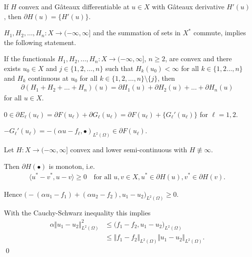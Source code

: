 \begin{frame}
  \begin{block}{}
    If $H$ convex and G\^{a}teaux differentiable
    at $u\in X$ with G\^{a}teaux derivative $H'(u)$, then
    $\partial H(u)=\{H'(u)\}$.
  \end{block}

  \pause

  $H_1,H_2,\ldots,H_n:X\to (-\infty,\infty]$ and the summation of sets in
  $X^\ast$ commute,
  \cite[S. 389, Theorem 47.B]{Zei85} implies the following statement.
  \begin{block}{}
    If the functionals $H_1,H_2,\ldots,H_n: X\to
    (-\infty,\infty]$, $n\geq 2$, are convex and there exists 
    $u_0\in X$ and $j\in\{1,2,\ldots,n\}$ such that $H_k(u_0)<\infty$
    for all $k\in\{1,2\ldots,n\}$
    and $H_k$ continuous at $u_0$ for all $k\in\{1,2,\ldots,n\}\setminus\{j\}$,
    then
    \begin{align*}
      \partial (H_1+H_2+\ldots+ H_n)(u) 
      = \partial H_1(u)+\partial H_2(u)+ \ldots + \partial H_n(u)
    \end{align*}
    for all $u\in X$.
  \end{block}
  \pause
  \medskip
  $0\in\partial E_\ell(u_\ell)
  = \partial F(u_\ell)+\partial G_\ell(u_\ell)=\partial F(u_\ell)+
  \{G_\ell'(u_\ell)\}$ for $\ell=1,2$.
\end{frame}

\begin{frame}
  $-G_\ell'(u_\ell)=-(\alpha u-f_\ell ,\bullet)_{L^2(\Omega)}\in\partial
  F(u_\ell)$.
  
  \pause
  \begin{block}{}
    Let $H:X\to (-\infty,\infty]$ convex and lower semi-continuous with
    $H\nequiv\infty$.
    
    Then $\partial H(\bullet)$ is monoton, i.e.
  \begin{align*}
    \langle u^\ast-v^\ast,u-v\rangle\geq 0\quad \text{for all } u,v\in X, 
    u^\ast \in \partial H(u), v^\ast \in \partial H(v).
  \end{align*}
  \end{block}

  \pause
  \medskip
  Hence
  $ \big( -(\alpha u_1 - f_1) + (\alpha u_2 - f_2), u_1 -
  u_2\big)_{L^2(\Omega)} \geq 0.  $

  \pause
  \medskip
  With the Cauchy-Schwarz inequality this implies
  \begin{align*}
    \alpha \Vert u_1 - u_2 \Vert_{L^2(\Omega)}^2
    &\leq
    \big(f_1 -f_2, u_1-u_2 \big)_{L^2(\Omega)}\\
    &\leq
    \Vert f_1-f_2\Vert_{L^2(\Omega)}\Vert u_1 - u_2\Vert_{L^2(\Omega)}.
  \end{align*}
  \qed
\end{frame}
